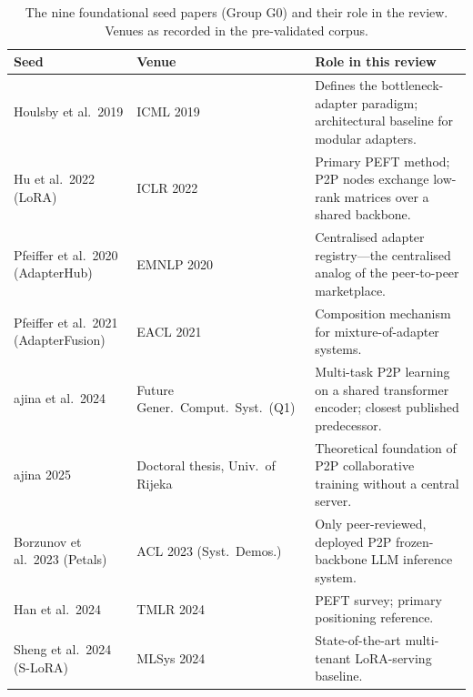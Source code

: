 \begin{table}[H]
\centering
\caption{The nine foundational seed papers (Group G0) and their role in the
review. Venues as recorded in the pre-validated corpus.}
\label{tab:g0_seeds}
\small
\setlength{\tabcolsep}{4pt}
\begin{tabular}{
  >{\raggedright\arraybackslash}p{}
  >{\raggedright\arraybackslash}p{}
  >{\raggedright\arraybackslash}p{}}
\toprule
\textbf{Seed} & \textbf{Venue} & \textbf{Role in this review} \\
\midrule
Houlsby et al.\ 2019 & ICML 2019 & Defines the bottleneck-adapter
paradigm; architectural baseline for modular adapters. \\
Hu et al.\ 2022 (LoRA) & ICLR 2022 & Primary PEFT method; P2P nodes
exchange low-rank matrices over a shared backbone. \\
Pfeiffer et al.\ 2020 (AdapterHub) & EMNLP 2020 & Centralised adapter
registry---the centralised analog of the peer-to-peer marketplace. \\
Pfeiffer et al.\ 2021 (AdapterFusion) & EACL 2021 & Composition mechanism
for mixture-of-adapter systems. \\
{\v{S}}ajina et al.\ 2024 & Future Gener.\ Comput.\ Syst.\ (Q1) &
Multi-task P2P learning on a shared transformer encoder; closest published
predecessor. \\
{\v{S}}ajina 2025 & Doctoral thesis, Univ.\ of Rijeka & Theoretical
foundation of P2P collaborative training without a central server. \\
Borzunov et al.\ 2023 (Petals) & ACL 2023 (Syst.~Demos.) & Only peer-reviewed,
deployed P2P frozen-backbone LLM inference system. \\
Han et al.\ 2024 & TMLR 2024 & PEFT survey; primary positioning reference. \\
Sheng et al.\ 2024 (S-LoRA) & MLSys 2024 & State-of-the-art multi-tenant
LoRA-serving baseline. \\
\bottomrule
\end{tabular}
\end{table}

